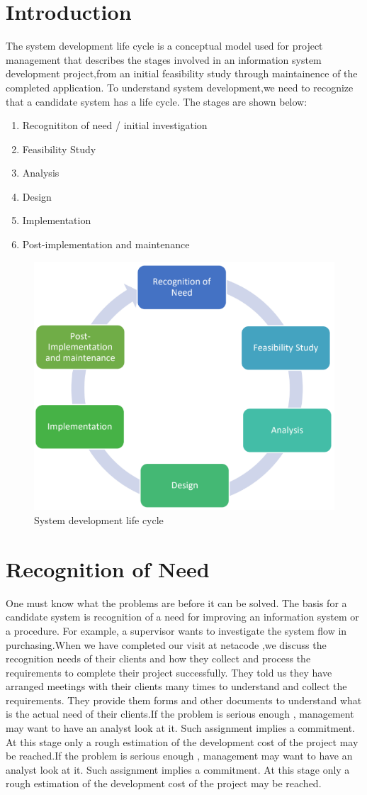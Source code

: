 \documentclass[a4paper,12pt]{report}
\begin{document}
\section{Introduction}
The system development life cycle is a conceptual model used for project management that describes the stages involved in an information system development project,from an initial feasibility study through maintainence of the completed application. To understand system development,we need to recognize that a candidate system has a life cycle. The stages are shown below:
\begin{enumerate}
	\item   Recognititon of need / initial investigation
	\item	Feasibility Study
	\item	Analysis
	\item   Design
	\item	Implementation
	\item	Post-implementation and maintenance   
	\end{enumerate}
\begin{figure}[h]
	\centering
	\includegraphics[width=0.7\linewidth]{2_1}
	\caption{System development life cycle}
	\label{fig:2_1}
\end{figure}
\section{Recognition of Need}
One must know what the problems are before it can be solved. The basis for a candidate system is recognition of a need for improving an information system or a procedure. For example, a supervisor wants to investigate the system flow in purchasing.When we have completed our visit at netacode ,we discuss the recognition needs of their clients and how they collect and process the requirements to complete their project  successfully. They told us they have arranged meetings with their clients many times to understand and collect the requirements. They provide them forms and other documents to understand what is the actual need of their clients.If the problem is serious enough , management may want to have an analyst look at it. Such assignment  implies a commitment. At this stage only a rough estimation of the development cost of the project may be reached.If the problem is serious enough , management may want to have an analyst look at it. Such assignment  implies a commitment. At this stage only a rough estimation of the development cost of the project may be reached.
\end{document}
